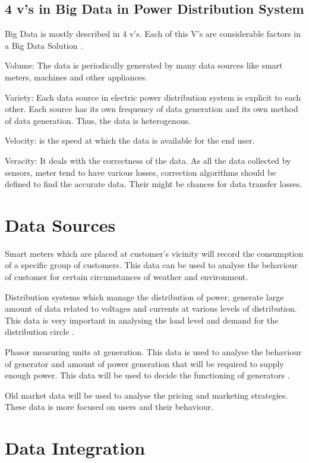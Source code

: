 \documentclass[sigconf]{acmart}
\begin{document}
\subsection{4 v's in Big Data in Power Distribution System}

Big Data is mostly described in 4 v's. Each of this V's are considerable factors in a Big Data Solution \cite{A.Munshi2017}.

Volume: The data is periodically generated by many data sources like smart meters, machines and other appliances.

Variety: Each data source in electric power distribution system is explicit to each other. Each source has its own frequency of data generation and its own method of data generation. Thus, the data is heterogenous.

Velocity: is the speed at which the data is available for the end user.

Veracity: It deals with the correctness of the data. As all the data collected by sensors, meter tend to have various losses, correction algorithms should be defined to find the accurate data. Their might be chances for data transfer losses.

\section{Data Sources}

Smart meters which are placed at customer's vicinity will record the consumption of a specific group of customers. This data can be used to analyse the behaviour of customer for certain circumstances of weather and environment.

Distribution systems which manage the distribution of power, generate large amount of data related to voltages and currents at various levels of distribution. This data is very important in analysing the load level and demand for the distribution circle \cite{Ali2013}.

 Phasor measuring units at generation. This data is used to analyse the behaviour of generator and amount of power generation that will be required to supply enough power. This data will be used to decide the functioning of generators \cite{ShadyS.Refaat2016}.
 
Old market data will be used to analyse the pricing and marketing strategies. These data is more focused on users and their behaviour.

\section{Data Integration}
\end{document}
